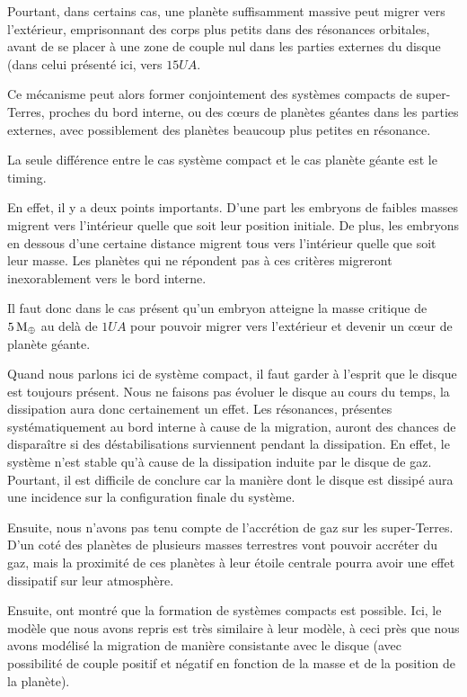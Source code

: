 Pourtant, dans certains cas, une planète suffisamment massive peut migrer vers l'extérieur, emprisonnant des corps plus petits dans des résonances orbitales, avant de se placer à une zone de couple nul dans les parties externes du disque (dans celui présenté ici, vers $15\unit{UA}$.

\bigskip

Ce mécanisme peut alors former conjointement des systèmes compacts de super-Terres, proches du bord interne, ou des cœurs de planètes géantes dans les parties externes, avec possiblement des planètes beaucoup plus petites en résonance. 

La seule différence entre le cas système compact et le cas planète géante est le timing. 

En effet, il y a deux points importants. D'une part les embryons de faibles masses migrent vers l'intérieur quelle que soit leur position initiale. De plus, les embryons en dessous d'une certaine distance migrent tous vers l'intérieur quelle que soit leur masse. Les planètes qui ne répondent pas à ces critères migreront inexorablement vers le bord interne. 

Il faut donc dans le cas présent qu'un embryon atteigne la masse critique de $5\mathrm{\thinspace M_\oplus}$ au delà de $1\unit{UA}$ pour pouvoir migrer vers l'extérieur et devenir un cœur de planète géante.

\bigskip

Quand nous parlons ici de système compact, il faut garder à l'esprit que le disque est toujours présent. Nous ne faisons pas évoluer le disque au cours du temps, la dissipation aura donc certainement un effet. Les résonances, présentes systématiquement au bord interne à cause de la migration, auront des chances de disparaître si des déstabilisations surviennent pendant la dissipation. En effet, le système n'est stable qu'à cause de la dissipation induite par le disque de gaz. Pourtant, il est difficile de conclure car la manière dont le disque est dissipé aura une incidence sur la configuration finale du système. 

Ensuite, nous n'avons pas tenu compte de l'accrétion de gaz sur les super-Terres. D'un coté des planètes de plusieurs masses terrestres vont pouvoir accréter du gaz, mais la proximité de ces planètes à leur étoile centrale pourra avoir une effet dissipatif sur leur atmosphère. 

Ensuite, \cite{terquem2007migration} ont montré que la formation de systèmes compacts est possible. Ici, le modèle que nous avons repris est très similaire à leur modèle, à ceci près que nous avons modélisé la migration de manière consistante avec le disque (avec possibilité de couple positif et négatif en fonction de la masse et de la position de la planète). 

